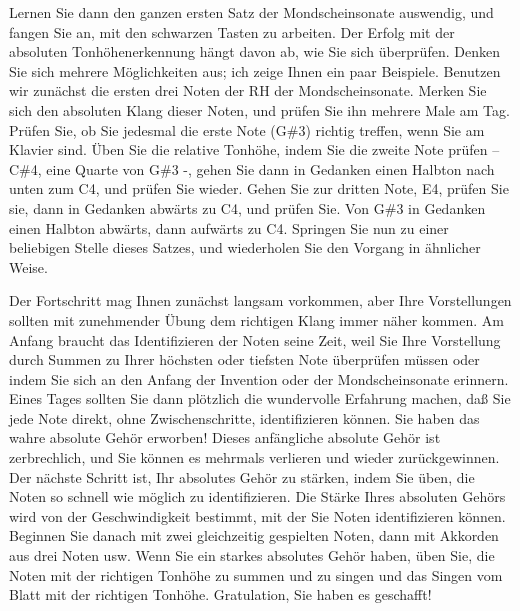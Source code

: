 Lernen Sie dann den ganzen ersten Satz der Mondscheinsonate auswendig, und fangen Sie an, mit den schwarzen Tasten zu arbeiten.
Der Erfolg mit der absoluten Tonhöhenerkennung hängt davon ab, wie Sie sich überprüfen.
Denken Sie sich mehrere Möglichkeiten aus; ich zeige Ihnen ein paar Beispiele.
Benutzen wir zunächst die ersten drei Noten der RH der Mondscheinsonate.
Merken Sie sich den absoluten Klang dieser Noten, und prüfen Sie ihn mehrere Male am Tag.
Prüfen Sie, ob Sie jedesmal die erste Note (G\#3) richtig treffen, wenn Sie am Klavier sind.
Üben Sie die relative Tonhöhe, indem Sie die zweite Note prüfen -- C\#4, eine Quarte von G\#3 -, gehen Sie dann in Gedanken einen Halbton nach unten zum C4, und prüfen Sie wieder.
Gehen Sie zur dritten Note, E4, prüfen Sie sie, dann in Gedanken abwärts zu C4, und prüfen Sie.
Von G\#3 in Gedanken einen Halbton abwärts, dann aufwärts zu C4.
Springen Sie nun zu einer beliebigen Stelle dieses Satzes, und wiederholen Sie den Vorgang in ähnlicher Weise.

Der Fortschritt mag Ihnen zunächst langsam vorkommen, aber Ihre Vorstellungen sollten mit zunehmender Übung dem richtigen Klang immer näher kommen.
Am Anfang braucht das Identifizieren der Noten seine Zeit, weil Sie Ihre Vorstellung durch Summen zu Ihrer höchsten oder tiefsten Note überprüfen müssen oder indem Sie sich an den Anfang der Invention oder der Mondscheinsonate erinnern.
Eines Tages sollten Sie dann plötzlich die wundervolle Erfahrung machen, daß Sie jede Note direkt, ohne Zwischenschritte,  identifizieren können.
Sie haben das wahre absolute Gehör erworben!
Dieses anfängliche absolute Gehör ist zerbrechlich, und Sie können es mehrmals verlieren und wieder zurückgewinnen.
Der nächste Schritt ist, Ihr absolutes Gehör zu stärken, indem Sie üben, die Noten so schnell wie möglich zu identifizieren.
Die Stärke Ihres absoluten Gehörs wird von der Geschwindigkeit bestimmt, mit der Sie Noten identifizieren können.
Beginnen Sie danach mit zwei gleichzeitig gespielten Noten, dann mit Akkorden aus drei Noten usw.
Wenn Sie ein starkes absolutes Gehör haben, üben Sie, die Noten mit der richtigen Tonhöhe zu summen und zu singen und das Singen vom Blatt mit der richtigen Tonhöhe.
Gratulation, Sie haben es geschafft!

